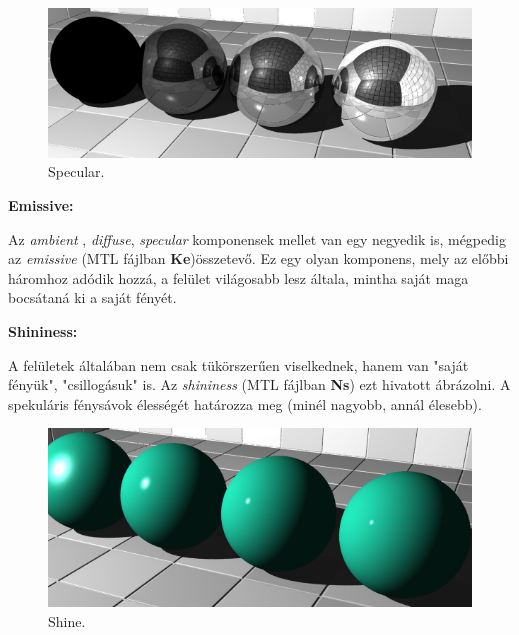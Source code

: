 \begin{figure}[h]
\centering
\includegraphics[scale=0.5]{images/specular.jpg}
\caption{Specular.}
\end{figure}

\noindent \textbf{Emissive:}

Az \textsl{ambient} , \textsl{diffuse}, \textsl{specular} komponensek mellet van egy negyedik is, mégpedig az \textsl{emissive} (MTL fájlban \textbf{Ke})összetevő. Ez egy olyan komponens, mely az előbbi háromhoz adódik hozzá, a felület világosabb lesz általa, mintha saját maga bocsátaná ki a saját fényét.\newline

\noindent \textbf{Shininess:}

A felületek általában nem csak tükörszerűen viselkednek, hanem van "saját fényük", "csillogásuk" is. Az \textsl{shininess} (MTL fájlban \textbf{Ns}) ezt hivatott ábrázolni. A spekuláris fénysávok élességét határozza meg (minél nagyobb, annál élesebb).

\begin{figure}[h]
\centering
\includegraphics[scale=0.5]{images/shine.jpg}
\caption{Shine.}
\end{figure}
\newpage
{}


